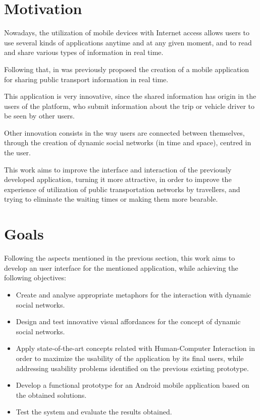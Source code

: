 \documentclass[9pt,a4paper]{extarticle}
\begin{document}
\begin{multicols}{2}

\section{Motivation}\label{sec:motiva}

Nowadays, the utilization of mobile devices with Internet access allows users to use several kinds of applications anytime and at any given moment, and to read and share various types of information in real time.

Following that, in was previously proposed the creation of a mobile application for sharing public transport information in real time. 

This application is very innovative, since the shared information has origin in the users of the platform, who submit information about the trip or vehicle driver to be seen by other users.

Other innovation consists in the way users are connected between themselves, through the creation of dynamic social networks (in time and space), centred in the user.

This work aims to improve the interface and interaction of the previously developed application, turning it more attractive, in order to improve the experience of utilization of public transportation networks by travellers, and trying to eliminate  the waiting times or making them more bearable.

\section{Goals}\label{sec:goals}

Following the aspects mentioned in the previous section, this work aims to develop an user interface for the mentioned application, while achieving the following objectives:

\begin{itemize}
\item Create and analyse appropriate metaphors for the interaction with dynamic social networks.
\item Design and test innovative visual affordances for the concept of dynamic social networks.
\item Apply state-of-the-art concepts related with Human-Computer Interaction in order to maximize the usability of the application by its final users, while addressing usability problems identified on the previous existing prototype.
\item Develop a functional prototype for an Android mobile application based on the obtained solutions.
\item Test the system and evaluate the results obtained. 
\end{itemize}


\end{multicols}
\end{document}
